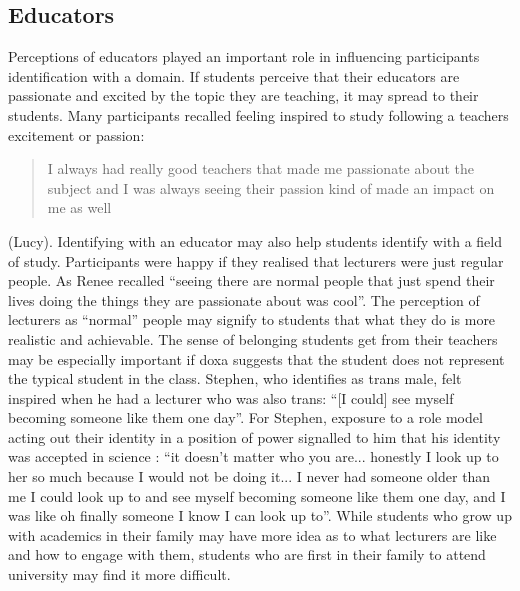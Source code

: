 \subsection{Educators}
Perceptions of educators played an important role in influencing participants identification with a domain. If students perceive that their educators are passionate and excited by the topic they are teaching, it may spread to their students. Many participants recalled feeling inspired to study following a teachers excitement or passion: \blockquote{I always had really good teachers that made me passionate about the subject and I was always seeing their passion kind of made an impact on me as well} (Lucy). Identifying with an educator may also help students identify with a field of study.  Participants were happy if they realised that lecturers were just regular people. As Renee recalled ``seeing there are normal people that just spend their lives doing the things they are passionate about was cool''. The perception of lecturers as ``normal'' people may signify to students that what they do is more realistic and achievable. The sense of belonging students get from their teachers may be especially important if doxa suggests that the student does not represent the typical student in the class. Stephen, who identifies as trans male, felt inspired when he had a lecturer who was also trans: ``[I could] see myself becoming someone like them one day''. For Stephen, exposure to a role model acting out their identity in a position of power signalled to him that his identity was accepted in science : ``it doesn't matter who you are... honestly I look up to her so much because I would not be doing it... I never had someone older than me I could look up to and see myself becoming someone like them one day, and I was like oh finally someone I know I can look up to''. While students who grow up with academics in their family may have more idea as to what lecturers are like and how to engage with them, students who are first in their family to attend university may find it more difficult.

